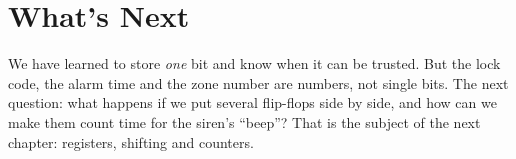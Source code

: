 \section{What's Next}

We have learned to store \emph{one} bit and know when it can be trusted. But the
lock code, the alarm time and the zone number are numbers, not single bits. The
next question: what happens if we put several flip-flops side by side, and how
can we make them count time for the siren's ``beep''? That is the subject of the
next chapter: registers, shifting and counters.
